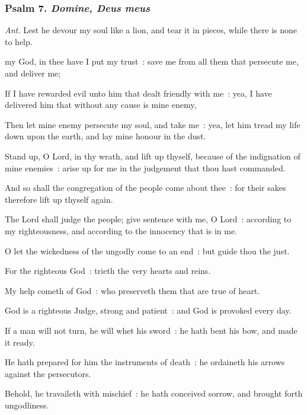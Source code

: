 \subsubsection{Psalm 7. \textit{Domine, Deus meus}}\par\noindent
\textit{Ant.} Lest he devour {\dag} my soul like a lion, and tear it in pieces, while there is none to help.\par
{} my God, in thee have I put my trust~: save me from all them that persecute me, and deliver me;\par
{}
If I have rewarded evil unto him that dealt friendly with me~: yea, I have delivered him that without any cause is mine enemy,\par
{}Then let mine enemy persecute my soul, and take me~: yea, let him tread my life down upon the earth, and lay mine honour in the dust.\par
{}Stand up, O Lord, in thy wrath, and lift up thyself, because of the indignation of mine enemies~: arise up for me in the judgement that thou hast commanded.\par
{}And so shall the congregation of the people come about thee~: for their sakes therefore lift up thyself again.\par
{}The Lord shall judge the people; give sentence with me, O Lord~: according to my righteousness, and according to the innocency that is in me.\par
{}O let the wickedness of the ungodly come to an end~: but guide thou the just.\par
{}For the righteous God~: trieth the very hearts and reins.\par
{}My help cometh of God~: who preserveth them that are true of heart.\par
{}God is a righteous Judge, strong and patient~: and God is provoked every day.\par
{}If a man will not turn, he will whet his sword~: he hath bent his bow, and made it ready.\par
{}He hath prepared for him the instruments of death~: he ordaineth his arrows against the persecutors.\par
{}Behold, he travaileth with mischief~: he hath conceived sorrow, and brought forth ungodliness.\par
